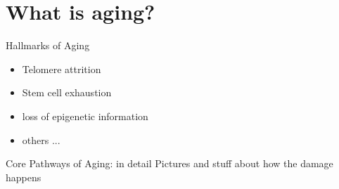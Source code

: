 \section{What is aging?}


\begin{frame}[c]{Hallmarks of Aging}
    \begin{itemize}[<+(1)->]
        \item Telomere attrition
        \item Stem cell exhaustion
        \item loss of epigenetic information
        \item others ...
    \end{itemize}
\end{frame}


\begin{frame}[c]{Core Pathways of Aging: in detail}
    Pictures and stuff about how the damage happens
\end{frame}

